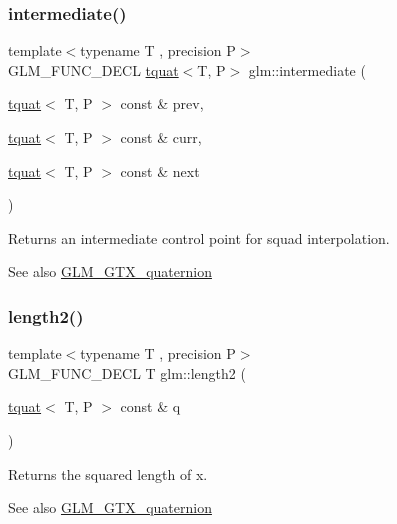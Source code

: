 \subsubsection{\texorpdfstring{intermediate()}{intermediate()}}
{\footnotesize\ttfamily template$<$typename T , precision P$>$ \\
G\+L\+M\+\_\+\+F\+U\+N\+C\+\_\+\+D\+E\+CL \hyperlink{structglm_1_1tquat}{tquat}$<$T, P$>$ glm\+::intermediate (\begin{DoxyParamCaption}\item[{\hyperlink{structglm_1_1tquat}{tquat}$<$ T, P $>$ const \&}]{prev,  }\item[{\hyperlink{structglm_1_1tquat}{tquat}$<$ T, P $>$ const \&}]{curr,  }\item[{\hyperlink{structglm_1_1tquat}{tquat}$<$ T, P $>$ const \&}]{next }\end{DoxyParamCaption})}

Returns an intermediate control point for squad interpolation.

\begin{DoxySeeAlso}{See also}
\hyperlink{group__gtx__quaternion}{G\+L\+M\+\_\+\+G\+T\+X\+\_\+quaternion} 
\end{DoxySeeAlso}
\mbox{\label{group__gtx__quaternion_ga02b45352c7ac345cabc9e877314acda6}} 
\subsubsection{\texorpdfstring{length2()}{length2()}}
{\footnotesize\ttfamily template$<$typename T , precision P$>$ \\
G\+L\+M\+\_\+\+F\+U\+N\+C\+\_\+\+D\+E\+CL T glm\+::length2 (\begin{DoxyParamCaption}\item[{\hyperlink{structglm_1_1tquat}{tquat}$<$ T, P $>$ const \&}]{q }\end{DoxyParamCaption})}

Returns the squared length of x.

\begin{DoxySeeAlso}{See also}
\hyperlink{group__gtx__quaternion}{G\+L\+M\+\_\+\+G\+T\+X\+\_\+quaternion} 
\end{DoxySeeAlso}
\mbox{\label{group__gtx__quaternion_ga791f42e134bfe97fc9c96f4668dd7489}} 
